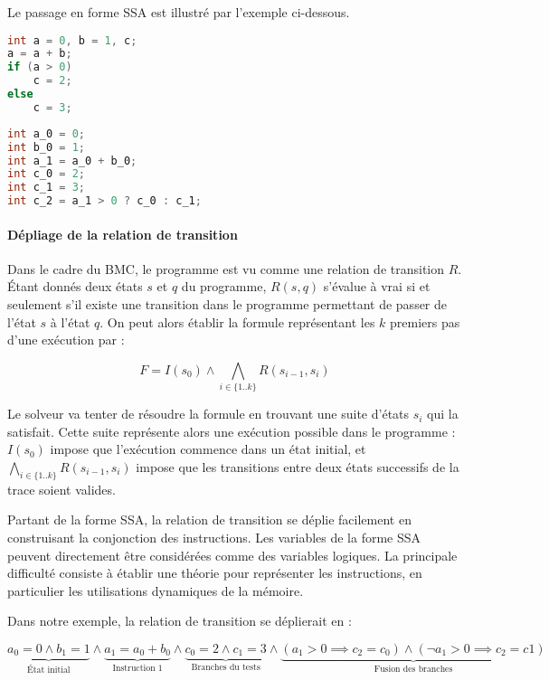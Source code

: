 Le passage en forme \ac{SSA} est illustré par l'exemple ci-dessous.

\noindent\begin{minipage}{.45\textwidth}
\begin{lstlisting}[language=C, caption=Code initial, frame=tlrb]
int a = 0, b = 1, c;
a = a + b;
if (a > 0)
    c = 2;
else
    c = 3;
\end{lstlisting}
\end{minipage}\hfill
\begin{minipage}{.45\textwidth}
\begin{lstlisting}[language=C, caption=Forme SSA,frame=tlrb]
int a_0 = 0;
int b_0 = 1;
int a_1 = a_0 + b_0;
int c_0 = 2;
int c_1 = 3;
int c_2 = a_1 > 0 ? c_0 : c_1;
\end{lstlisting}
\end{minipage}

\paragraph{Dépliage de la relation de transition}
Dans le cadre du \ac{BMC}, le programme est vu comme une relation de transition
\(R\). Étant donnés deux états \(s\) et \(q\) du programme, \(R(s, q)\) s'évalue
à vrai si et seulement s’il existe une transition dans le programme permettant
de passer de l'état \(s\) à l'état \(q\). On peut alors établir la formule
représentant les \(k\) premiers pas d'une exécution par :

\[
F = I(s_0) \land \bigwedge_{i\in \{1..k\}} R(s_{i-1}, s_i)
\]

Le solveur va tenter de résoudre la formule en trouvant une suite d'états
\(s_i\) qui la satisfait. Cette suite représente alors une exécution possible
dans le programme : \(I(s_0)\) impose que l'exécution commence dans un état
initial, et \(\bigwedge_{i\in \{1..k\}} R(s_{i-1}, s_i)\) impose que les
transitions entre deux états successifs de la trace soient valides.

Partant de la forme \ac{SSA}, la relation de transition se déplie facilement
en construisant la conjonction des instructions. Les variables de la forme \ac{SSA}
peuvent directement être considérées comme des variables logiques. La principale
difficulté consiste à établir une théorie pour représenter les
instructions, en particulier les utilisations dynamiques de la mémoire.

Dans notre exemple, la relation de transition se déplierait en :

\[
  \underbrace{a_0 = 0 \land b_1 = 1}_\text{État initial} \land
  \underbrace{a_1 = a_0 + b_0}_\text{Instruction 1} \land
  \underbrace{c_0 = 2 \land c_1 = 3}_\text{Branches du tests} \land
  \underbrace{(a_1 > 0 \implies c_2 = c_0)
    \land (\lnot a_1 > 0 \implies c_2 = c1)
  }_\text{Fusion des branches}
\]


